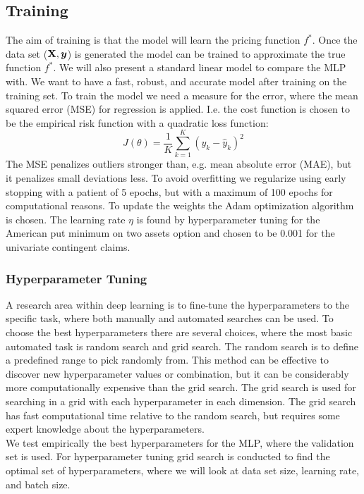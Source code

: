 \subsection{Training}\label{Training}
The aim of training is that the model will learn the pricing function $f^*$. Once the data set ($\mathbf{X}, \bm{y}$) is generated the model can be trained to approximate the true function $f^*$. We will also present a standard linear model to compare the MLP with. We want to have a fast, robust, and accurate model after training on the training set. To train the model we need a measure for the error, where the mean squared error (MSE) for regression is applied. I.e. the cost function is chosen to be the empirical risk function with a quadratic loss function:
$$J(\theta)= \frac{1}{K} \sum_{k=1}^{K}(y_k-\hat{y}_k)^2$$
The MSE penalizes outliers stronger than, e.g. mean absolute error (MAE), but it penalizes small deviations less. To avoid overfitting we regularize using early stopping with a patient of 5 epochs, but with a maximum of 100 epochs for computational reasons. To update the weights the Adam optimization algorithm is chosen.  The learning rate $\eta$ is found by hyperparameter tuning for the American put minimum on two assets option and chosen to be 0.001 for the univariate contingent claims.\\

\subsubsection{Hyperparameter Tuning}
A research area within deep learning is to fine-tune the hyperparameters to the specific task, where both manually and automated searches can be used. To choose the best hyperparameters there are several choices, where the most basic automated task is random search and grid search. The random search is to define a predefined range to pick randomly from. This method can be effective to discover new hyperparameter values or combination, but it can be considerably more computationally expensive than the grid search. The grid search is used for searching in a grid with each hyperparameter in each dimension. The grid search has fast computational time relative to the random search, but requires some expert knowledge about the hyperparameters.\\

We test empirically the best hyperparameters for the MLP, where the validation set is used. For hyperparameter tuning grid search is conducted to find the optimal set of hyperparameters, where we will look at data set size, learning rate, and batch size. \\

